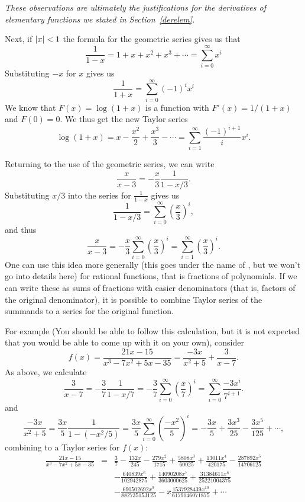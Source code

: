 {\em These observations are ultimately the
justifications for the derivatives of elementary functions we stated in
Section~\ref{derelem}.}
\smallskip

Next, if $\left|x\right|<1$ the formula for the geometric series gives us that
\[
\frac{1}{1-x}=1+x+x^2+x^3+\cdots=\sum_{i=0}^\infty x^i
\]
Substituting $-x$ for $x$ gives us
\[
\frac{1}{1+x}=\sum_{i=0}^\infty (-1)^i x^i
\]
We know that $F(x)=\log(1+x)$ is a function with $F'(x)=1/(1+x)$ and
$F(0)=0$. We thus get the new Taylor series
\[
\log(1+x)=x-\frac{x^2}{2}+\frac{x^3}{3}-\cdots=\sum_{i=1}^\infty\frac{(-1)^{i+1}}{i}x^i.
\]
\smallskip

Returning to the use of the geometric series, we can write
\[
\frac{x}{x-3}=-\frac{x}{3}\frac{1}{1-x/3}.
\]
Substituting $x/3$ into the series for $\frac{1}{1-x}$ gives us
\[
\frac{1}{1-x/3}=\sum_{i=0}^\infty \left(\frac{x}{3}\right)^i,
\]
and thus
\[
\frac{x}{x-3}= -\frac{x}{3}\sum_{i=0}^\infty \left(\frac{x}{3}\right)^i
= \sum_{i=1}^\infty \left(\frac{x}{3}\right)^i.
\]
One can use this idea more generally (this goes under the name of
, but we won't go into details here) for rational
functions, that is fractions of polynomials. If we can write these as sums
of fractions with easier denominators (that is, factors of the original
denominator), it is possible to combine Taylor series of the summands to a
series for the original function.

For example (You should be able to follow this calculation, but it is not
expected that you would be able to come up with it on your own), consider
\[
f(x)=\frac{21x-15}{x^3-7x^2+5x-35}=\frac{-3x}{x^2+5}+\frac{3}{x-7}.
\]
As above, we calculate
\[
\frac{3}{x-7}=-\frac{3}{7}\frac{1}{1-x/7}=-\frac{3}{7}
\sum_{i=0}^\infty \left(\frac{x}{7}\right)^i
=\sum_{i=0}^\infty \frac{-3x^i}{7^{i+1}}.
\]
and
\[
\frac{-3x}{x^2+5}=\frac{3x}{5}\frac{1}{1-(-x^2/5)}=\frac{3x}{5}
\sum_{i=0}^\infty \left(\frac{-x^2}{5}\right)^i
=-\frac{3x}{5}
+\frac{3x^3}{25}
-\frac{3x^5}{125}+\cdots,
\]
combining to a Taylor series for $f(x)$:
\begin{eqnarray*}
\frac{21x-15}{x^3-7x^2+5x-35}&=&
\frac{3}{7}-\frac{132 x}{245}-\frac{279 x^{2}}{1715}+\frac{5808
x^{3}}{60025}+\frac{13011 x^{4}}{420175}-\frac{287892 x^{5}}{14706125}\\
&&-\frac{640839 x^{6}}{102942875}+\frac{14090208 x^{7}}{3603000625}
+\frac{31384611 x^{8}}{25221004375}\\
&&-\frac{690502692 x^{9}}{882735153125}-
x\frac{1537928439 x^{10}}{6179146071875}
+\cdots
\end{eqnarray*}

